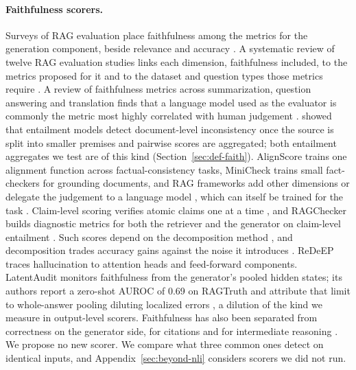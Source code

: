 \documentclass[11pt]{article}
\newcommand{\movedref}{Appendix}            %
\newcommand{\movedref}{Section}
\begin{document}
\paragraph{Faithfulness scorers.}
Surveys of RAG evaluation place faithfulness among the metrics for the generation component, beside relevance and accuracy \citep{yu-etal-2025-evaluation}. A systematic review of twelve RAG evaluation studies links each dimension, faithfulness included, to the metrics proposed for it and to the dataset and question types those metrics require \citep{knollmeyer-etal-2026}. A review of faithfulness metrics across summarization, question answering and translation finds that a language model used as the evaluator is commonly the metric most highly correlated with human judgement \citep{malin-etal-2025}. \citet{laban-etal-2022-summac} showed that entailment models detect document-level inconsistency once the source is split into smaller premises and pairwise scores are aggregated; both entailment aggregates we test are of this kind (Section~\ref{sec:def-faith}). AlignScore \citep{zha-etal-2023} trains one alignment function across factual-consistency tasks, MiniCheck \citep{tang-etal-2024} trains small fact-checkers for grounding documents, and RAG frameworks add other dimensions or delegate the judgement to a language model \citep{es-etal-2024,saad-falcon-etal-2024,tamber-etal-2025,murugaraj-etal-2026}, which can itself be trained for the task \citep{li-etal-2025-rag}. Claim-level scoring verifies atomic claims one at a time \citep{min-etal-2023-factscore}, and RAGChecker builds diagnostic metrics for both the retriever and the generator on claim-level entailment \citep{ru-etal-2024-ragchecker}. Such scores depend on the decomposition method \citep{wanner-etal-2024-closer}, and decomposition trades accuracy gains against the noise it introduces \citep{hu-etal-2025-decomposition}. ReDeEP \citep{sun-etal-2025} traces hallucination to attention heads and feed-forward components. LatentAudit monitors faithfulness from the generator's pooled hidden states; its authors report a zero-shot AUROC of 0.69 on RAGTruth and attribute that limit to whole-answer pooling diluting localized errors \citep{yu-etal-2026-latentaudit}, a dilution of the kind we measure in output-level scorers. Faithfulness has also been separated from correctness on the generator side, for citations \citep{wallat-etal-2025} and for intermediate reasoning \citep{xu-etal-2025}. We propose no new scorer. We compare what three common ones detect on identical inputs, and \movedref~\ref{sec:beyond-nli} considers scorers we did not run.
\end{document}
